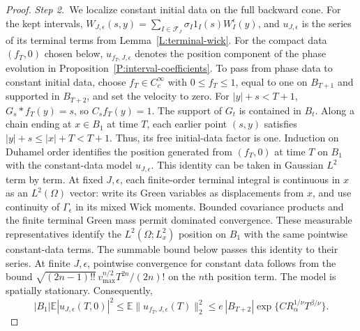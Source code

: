 \documentclass[12pt,oneside,openany]{book}
\numberwithin{equation}{section}
\theoremstyle{nogostyle}
\theoremstyle{definition}
\newcommand{\E}{\mathbb{E}}
\begin{document}
\begin{proof}
  \medskip
  \noindent\textit{Step 2.~}We localize constant initial data on the full
  backward cone.
  For the kept intervals, $W_{J,\epsilon}(s,y)=\sum_{I\in\mathcal
  F_J}\sigma_I1_I(s)W_I^\epsilon(y)$, and $u_{J,\epsilon}$ is the series of
  its terminal terms from Lemma~\ref{L:terminal-wick}. For the compact data
  $(f_T,0)$ chosen below, $u_{f_T,J,\epsilon}$ denotes the position component
  of the phase evolution in Proposition~\ref{P:interval-coefficients}.
  To pass from phase data to constant initial data, choose $f_T \in C_c^\infty$
  with $0 \le f_T \le 1$, equal to one on $B_{T+1}$ and supported in $B_{T+2}$,
  and set the velocity to zero. For $|y|+s < T+1$, $G_s*f_T(y) = s$, so
  $C_sf_T(y) = 1$. The support of $G_t$ is contained in $B_t$. Along a chain
  ending at $x \in B_1$ at time $T$, each earlier point $(s,y)$ satisfies $|y|+s
  \le |x|+T < T+1$. Thus, its free initial-data factor is one. Induction on
  Duhamel order identifies the position generated from $(f_T,0)$ at time $T$ on
  $B_1$ with the constant-data model $u_{J,\epsilon}$. This identity can be
  taken in Gaussian $L^2$ term by term. At fixed $J,\epsilon$, each finite-order
  terminal integral is continuous in $x$ as an $L^2(\Omega)$ vector: write its
  Green variables as displacements from $x$, and use continuity of
  $\Gamma_\epsilon$ in its mixed Wick moments. Bounded covariance products and
  the finite terminal Green mass permit dominated convergence. These measurable
  representatives identify the $L^2(\Omega;L^2_x)$ position on $B_1$ with the
  same pointwise constant-data terms. The summable bound below passes this
  identity to their series. At finite $J,\epsilon$, pointwise convergence for
  constant data follows from the bound
  $\sqrt{(2n-1)!!}\,v_{\max}^{n/2}T^{2n}/(2n)!$ on the $n$th position term. The
  model is spatially stationary. Consequently,
  \[
    |B_1|\E|u_{J,\epsilon}(T,0)|^2
    \le\E\|u_{f_T,J,\epsilon}(T)\|_2^2
    \le e\,|B_{T+2}|\exp\{C R_\alpha^{1/\nu}T^{\beta/\nu}\}.
  \]



\end{proof}
\end{document}
